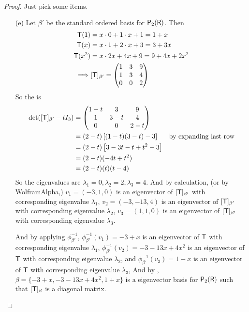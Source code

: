 \begin{proof}
Just pick some items.

\begin{enumerate}
\item[(e)] Let \(\beta'\) be the standard ordered basis for \(\textsf{P}_2(\textsf{R})\).
Then
\begin{align*}
    \textsf{T}(1) & = x \cdot 0 + 1 \cdot x + 1 = 1 + x \\
    \textsf{T}(x) & = x \cdot 1 + 2 \cdot x + 3 = 3 + 3x \\
    \textsf{T}(x^2) & = x \cdot 2x + 4x + 9 = 9 + 4x + 2x^2 \\
    \implies & [\textsf{T}]_{\beta'} = \begin{pmatrix}
        1 & 3 & 9 \\
        1 & 3 & 4 \\
        0 & 0 & 2
    \end{pmatrix}
\end{align*}
So the \CPOLY{} is
\begin{align*}
    \det([\textsf{T}]_{\beta'} - tI_3) & = \begin{pmatrix}
        1-t & 3   & 9 \\
        1   & 3-t & 4 \\
        0   & 0   & 2-t
    \end{pmatrix} \\
    & = (2 - t)\left[ (1 - t)(3 - t) - 3 \right] & \text{by expanding last row} \\
    & = (2 - t)\left[ 3 - 3t - t + t^2 -3 \right] \\
    & = (2 - t)(-4t + t^2) \\
    & = (2 - t)(t)(t - 4)
\end{align*}
So the eigenvalues are \(\lambda_1 = 0, \lambda_2 = 2, \lambda_3 = 4\).
And by calculation, (or by WolframAlpha,) \(v_1 = (-3, 1, 0)\) is an eigenvector of \([\textsf{T}]_{\beta'}\) with corresponding eigenvalue \(\lambda_1\),
\(v_2 = (-3, -13, 4)\) is an eigenvector of \([\textsf{T}]_{\beta'}\) with corresponding eigenvalue \(\lambda_2\),
\(v_3 = (1, 1, 0)\) is an eigenvector of \([\textsf{T}]_{\beta'}\) with corresponding eigenvalue \(\lambda_3\).

And by applying \(\phi_{\beta'}^{-1}\),
\(\phi_{\beta'}^{-1}(v_1) = -3 + x\) is an eigenvector of \(\textsf{T}\) with corresponding eigenvalue  \(\lambda_1\),
\(\phi_{\beta'}^{-1}(v_2) = -3 -13x + 4x^2\) is an eigenvector of \(\textsf{T}\) with corresponding eigenvalue \(\lambda_2\),
and \(\phi_{\beta'}^{-1}(v_3) = 1 + x\) is an eigenvector of \(\textsf{T}\) with corresponding eigenvalue \(\lambda_3\),
And by , \(\beta = \{ -3 + x, -3 - 13x + 4x^2, 1 + x \}\) is a eigenvector basis for \(\textsf{P}_2(\textsf{R})\) such that \([\textsf{T}]_{\beta}\) is a diagonal matrix.


\end{enumerate}
\end{proof}
